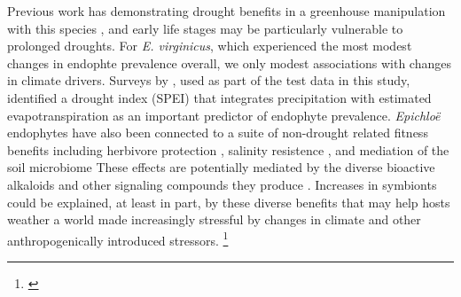 \documentclass[11pt]{article}
\newcommand{\tom}[2]{{\color{red}{#1}}\footnote{\textit{\color{red}{#2}}}}
\begin{document}
Previous work has demonstrating drought benefits in a greenhouse manipulation with this species \citep{davitt2011understanding}, and early life stages may be particularly vulnerable to prolonged droughts.
For \emph{E. virginicus}, which experienced the most modest changes in endophte prevalence overall, we only modest associations with changes in climate drivers. 
Surveys by \citet{sneck2017variation}, used as part of the test data in this study, identified a drought index (SPEI) that integrates precipitation with estimated evapotranspiration as an important predictor of endophyte prevalence.
\emph{Epichloë} endophytes have also been connected to a suite of non-drought related fitness benefits including herbivore protection \citep{brem2001epichloe}, salinity resistence \citep{wang2020effects}, and mediation of the soil microbiome \citep{roberts2015rhizosphere} 
These effects are potentially mediated by the diverse bioactive alkaloids and other signaling compounds they produce \citep{saikkonen2013chemical}.
Increases in symbionts could be explained, at least in part, by these diverse benefits that may help hosts weather a world made increasingly stressful by changes in climate and other anthropogenically introduced stressors.
\tom{While we show consistent increasing trends in prevalence between the three species, the mechanisms that explain these changes may be diverse and idiosyncratic.}{This paragraph was a little hard to read and I think does not really nail the points that I think we should make here, IMO. I would open to paragraph setting up the idea that the correlations you detected have some support in previous experimental studies, then elaborate. Then I would acknowledge that other factors can elicit benefits of symbiosis, and these factors may ALSO be changing. The takeaway, for me and perhaps for readers more generally, is that we are very confident endophytes are increasing, we have some confidence that is associated with (and perhaps due to) climate change, but a lot has changed over the past 200 years (climate, urbanization, nitrogen deposition, invasive species, deer!) and we need follow-up studies and experiments to gain a better mechanistic understanding of what has driven these changes, which will also allow us to build better forecasts about the future.}
\end{document}
